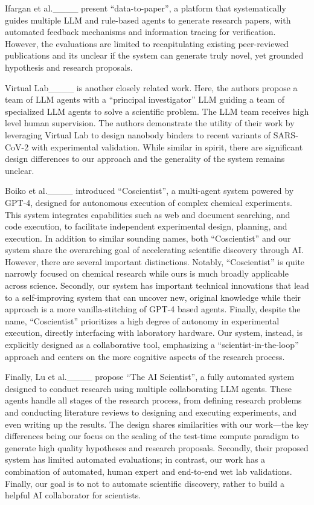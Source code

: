 Ifargan et al.____ present ``data-to-paper'', a platform that systematically guides multiple LLM and rule-based agents to generate research papers, with automated feedback mechanisms and information tracing for verification. However, the evaluations are limited to recapitulating existing peer-reviewed publications and its unclear if the system can generate truly novel, yet grounded hypothesis and research proposals.

Virtual Lab____ is another closely related work. Here, the authors propose a team of LLM agents with a ``principal investigator'' LLM guiding a team of specialized LLM agents to solve a scientific problem. The LLM team receives high level human supervision. The authors demonstrate the utility of their work by leveraging Virtual Lab to design nanobody binders to recent variants of SARS-CoV-2 with experimental validation. While similar in spirit, there are significant design differences to our approach and the generality of the system remains unclear.

Boiko et al.____ introduced ``Coscientist'', a multi-agent system powered by GPT-4, designed for autonomous execution of complex chemical experiments. This system integrates capabilities such as web and document searching, and code execution, to facilitate independent experimental design, planning, and execution. In addition to similar sounding names, both ``Coscientist'' and our system share the overarching goal of accelerating scientific discovery through AI. However, there are several important distinctions. Notably, ``Coscientist'' is quite narrowly focused on chemical research while ours is much broadly applicable across science. Secondly, our system has important technical innovations that lead to a self-improving system that can uncover new, original knowledge while their approach is a more vanilla-stitching of GPT-4 based agents. Finally, despite the name, ``Coscientist'' prioritizes a high degree of autonomy in experimental execution, directly interfacing with laboratory hardware. Our system, instead, is explicitly designed as a collaborative tool, emphasizing a ``scientist-in-the-loop'' approach and centers on the more cognitive aspects of the research process.

Finally, Lu et al.____ propose ``The AI Scientist'', a fully automated system designed to conduct research using multiple collaborating LLM agents. These agents handle all stages of the research process, from defining research problems and conducting literature reviews to designing and executing experiments, and even writing up the results. The design shares similarities with our work---the key differences being our focus on the scaling of the test-time compute paradigm to generate high quality hypotheses and research proposals. Secondly, their proposed system has limited automated evaluations; in contrast, our work has a combination of automated, human expert and end-to-end wet lab validations. Finally, our goal is to not to automate scientific discovery, rather to build a helpful AI collaborator for scientists.

